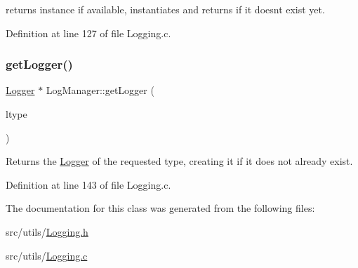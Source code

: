 returns instance if available, instantiates and returns if it doesn\textquotesingle{}t exist yet. 



Definition at line 127 of file Logging.\+c.

\mbox{\label{class_world_architect_1_1_log_manager_acd160df28467052ffcb0adac0a5ec40b}} 
\subsubsection{\texorpdfstring{getLogger()}{getLogger()}}
{\footnotesize\ttfamily \mbox{\hyperlink{class_world_architect_1_1_logger}{Logger}} $\ast$ Log\+Manager\+::get\+Logger (\begin{DoxyParamCaption}\item[{\mbox{\hyperlink{namespace_world_architect_adf13e54f2c38346ed9d5013cff07fc8e}{Log\+Type}}}]{ltype }\end{DoxyParamCaption})}



Returns the \mbox{\hyperlink{class_world_architect_1_1_logger}{Logger}} of the requested type, creating it if it does not already exist. 



Definition at line 143 of file Logging.\+c.



The documentation for this class was generated from the following files\+:\begin{DoxyCompactItemize}
\item 
src/utils/\mbox{\hyperlink{_logging_8h}{Logging.\+h}}\item 
src/utils/\mbox{\hyperlink{_logging_8c}{Logging.\+c}}\end{DoxyCompactItemize}
